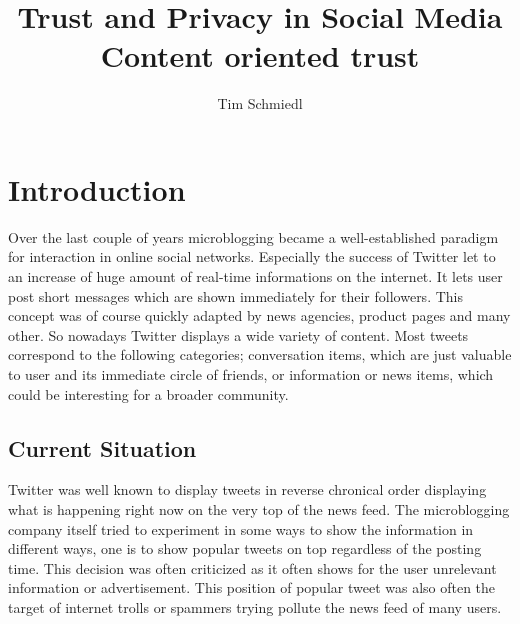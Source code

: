 \documentclass{proseminar}
\begin{document}

\title{Trust and Privacy in Social Media \\
\huge Content oriented trust}

\author{
Tim Schmiedl\\
}

\maketitle

\section{Introduction}
Over the last couple of years microblogging became a well-established paradigm for interaction in online social networks.
Especially the success of Twitter let to an increase of huge amount of real-time informations on the internet. It lets user post short messages which are shown immediately for their followers. This concept was of course quickly adapted by news agencies, product pages and many other. So nowadays Twitter displays a wide variety of content. Most tweets correspond to the following categories; conversation items, which are just valuable to user and its immediate circle of friends, or information or news items, which could be interesting for a broader community.



\subsection*{Current Situation}
Twitter was well known to display tweets in reverse chronical order displaying what is happening right now on the very top of the news feed. 
The microblogging company itself tried to experiment in some ways to show the information in different ways, one is to show popular tweets on top regardless of the posting time.
This decision was often criticized as it often shows for the user unrelevant information or advertisement. This position of popular tweet was also often the target of internet trolls or spammers trying pollute the news feed of many users.
\end{document}
